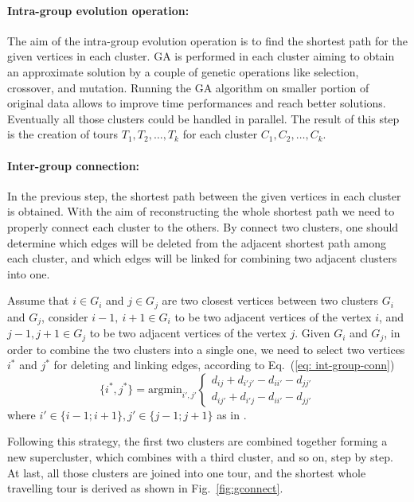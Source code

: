 \documentclass[10pt]{article}
\begin{document}
\paragraph{Intra-group evolution operation:}
The aim of the intra-group evolution operation is to find the shortest path for the given vertices in each cluster.
GA is performed in each cluster aiming to obtain an approximate solution by a couple of genetic operations like selection, crossover, and mutation.
Running the GA algorithm on smaller portion of original data allows to improve time performances and reach better solutions.
Eventually all those clusters could be handled in parallel.
The result of this step is the creation of tours $T_1,T_2,\dots,T_k$ for each cluster  $C_1,C_2,…,C_k$.

\paragraph{Inter-group connection:}
In the previous step, the shortest path between the given vertices in each cluster is obtained.
With the aim of reconstructing the whole shortest path we need to properly connect each cluster to the others.
By connect two clusters, one should determine which edges will be deleted from the adjacent shortest path among each cluster, and which edges will be linked for combining two adjacent clusters into one.
 
Assume that $i \in G_i$ and $j \in G_j$ are two closest vertices between two clusters $G_i$ and $G_j$, consider $i−1,~i+1 \in G_i$ to be two adjacent vertices of the vertex $i$, and $j−1,j+1 \in G_j$ to be two adjacent vertices of the vertex $j$. 
Given $G_i$ and $G_j$, in order to combine the two clusters into a single one, we need to select two vertices $i^*$ and $j^*$ for deleting and linking edges, according to Eq.~(\ref{eq: int-group-conn}) 
\begin{equation}
\{i^*,j^*\} = \mathrm{arg min}_{i',j'} 
\begin{cases}
d_{ij} + d_{i'j'} - d_{ii'} - d_{jj'}\\d_{ij'} + d_{i'j} - d_{ii'} - d_{jj'}
\end{cases}
\label{eq: int-group-conn}
\end{equation}
where $i' \in \{i-1; i+1\}, j' \in \{j-1;j+1\}$ as in \cite{ventitre}.

Following this strategy, the first two clusters are combined together forming a new supercluster, which combines with a third cluster, and so on, step by step. 
At last, all those clusters are joined into one tour, and the shortest whole travelling tour is derived as shown in Fig.~\ref{fig:gconnect}.
\end{document}
